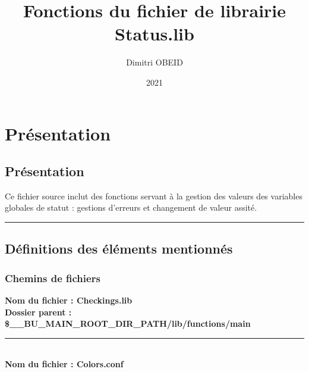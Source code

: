 \documentclass[a4paper,10pt]{article}
\title{\color{red}Fonctions du fichier de librairie \color{lime}Status.lib}\color{white}
\author{Dimitri OBEID}
\date{2021}
\begin{document}
\maketitle
\newpage

\hypertarget{contents}{}
\tableofcontents
\newpage

\color{red}
\section{Présentation}\color{white}

\color{green}
\subsection{Présentation}\color{white}

\begin{justify}
    Ce fichier source inclut des fonctions servant à la gestion des valeurs des variables globales de statut : gestions d'erreurs et changement de valeur assité.
\end{justify}




\color{green}\par\noindent\rule{\textwidth}{0.4pt}\color{white}

\color{green}
\subsection{Définitions des éléments mentionnés}\color{white}

\color{blue}
\subsubsection{Chemins de fichiers}\color{white}

\textbf{Nom du fichier : \color{lime}Checkings.lib}\\[1\baselineskip]
\textbf{Dossier parent : \color{orange}\$\_\_BU\_MAIN\_ROOT\_DIR\_PATH\color{lime}/lib/functions/main}\\[1\baselineskip]



\color{lime}\par\noindent\rule{\textwidth}{0.4pt}\color{white}\\[1\baselineskip]

\textbf{Nom du fichier : \color{lime}Colors.conf}\\[1\baselineskip]
\end{document}
